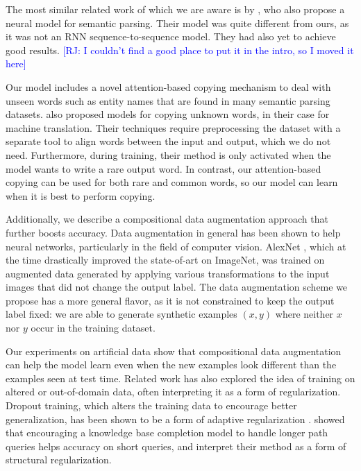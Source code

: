\documentclass[11pt,letterpaper]{article}
\newcommand\rj[1]{\textcolor{blue}{[RJ: #1]}}
\begin{document}
The most similar related work of which we are aware is
by ,
who also propose a neural model for semantic parsing.
Their model was quite different from ours, as
it was not an RNN sequence-to-sequence model.
They had also yet to achieve good results.
\rj{I couldn't find a good place to put it in the intro, so I moved it here}

Our model includes a novel attention-based copying mechanism
to deal with unseen words such as entity names that are found in many semantic parsing datasets.
 also proposed models for copying
unknown words, in their case for machine translation. 
Their techniques require preprocessing the dataset
with a separate tool to align words between the input and output,
which we do not need.
Furthermore, during training, their method is only activated when the model
wants to write a rare output word. 
In contrast, our attention-based copying can be used for 
both rare and common words,
so our model can learn when it is best to perform copying.

Additionally, we describe a compositional data augmentation approach that 
further boosts accuracy.
Data augmentation in general has been shown to help neural networks,
particularly in the field of computer vision.
AlexNet \cite{krizhevsky2012imagenet}, 
which at the time drastically improved
the state-of-art on ImageNet,
was trained on augmented data generated by applying various transformations
to the input images that did not change the output label.
The data augmentation scheme we propose has a more general flavor,
as it is not constrained to keep the output label fixed:
we are able to generate synthetic examples $(x, y)$
where neither $x$ nor $y$ occur in the training dataset.

Our experiments on artificial data show that
compositional data augmentation can help the model learn
even when the new examples look different than the examples seen at test time.  
Related work has also explored the idea of training on 
altered or out-of-domain data, often interpreting
it as a form of regularization.
Dropout training, which alters the training data
to encourage better generalization, has
been shown to be a form of adaptive regularization
\cite{hinton2012improving,wager2014altitude}.
showed that encouraging a knowledge base completion model
to handle longer path queries helps accuracy on
short queries, and interpret their method as
a form of structural regularization.
\end{document}
